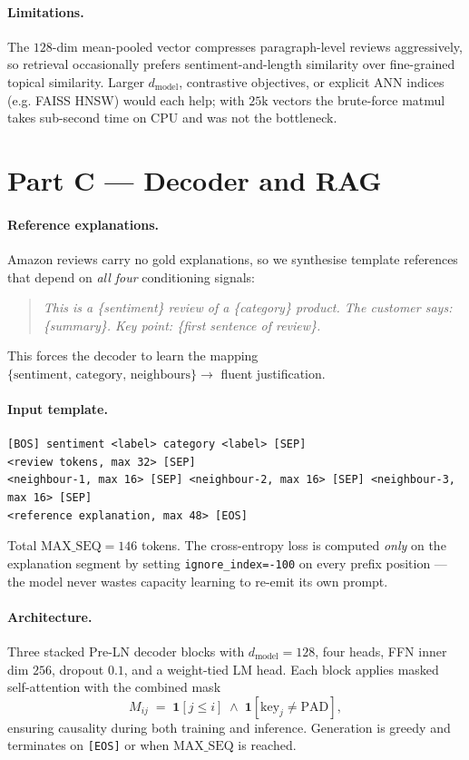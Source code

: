 \documentclass[11pt,a4paper]{article}
\begin{document}
\paragraph{Limitations.}
The $128$-dim mean-pooled vector compresses paragraph-level reviews
aggressively, so retrieval occasionally prefers sentiment-and-length
similarity over fine-grained topical similarity. Larger $d_{\text{model}}$,
contrastive objectives, or explicit ANN indices (e.g. FAISS HNSW) would
each help; with $25\text{k}$ vectors the brute-force matmul takes
sub-second time on CPU and was not the bottleneck.

\section{Part C --- Decoder and RAG}
\label{sec:partc}

\paragraph{Reference explanations.}
Amazon reviews carry no gold explanations, so we synthesise template
references that depend on \emph{all four} conditioning signals:
\begin{quote}\itshape
This is a \{sentiment\} review of a \{category\} product. The customer
says: \{summary\}. Key point: \{first sentence of review\}.
\end{quote}
This forces the decoder to learn the mapping
$\{\text{sentiment, category, neighbours}\} \to$ fluent justification.

\paragraph{Input template.}
\begin{lstlisting}
[BOS] sentiment <label> category <label> [SEP]
<review tokens, max 32> [SEP]
<neighbour-1, max 16> [SEP] <neighbour-2, max 16> [SEP] <neighbour-3, max 16> [SEP]
<reference explanation, max 48> [EOS]
\end{lstlisting}
Total $\text{MAX\_SEQ} = 146$ tokens. The cross-entropy loss is computed
\emph{only} on the explanation segment by setting \texttt{ignore\_index=-100}
on every prefix position --- the model never wastes capacity learning to
re-emit its own prompt.

\paragraph{Architecture.}
Three stacked Pre-LN decoder blocks with $d_{\text{model}} = 128$, four
heads, FFN inner dim $256$, dropout $0.1$, and a weight-tied LM head. Each
block applies masked self-attention with the combined mask
\[
  M_{ij} \;=\; \mathbf{1}[j \le i]\;\wedge\;\mathbf{1}[\text{key}_j \neq \text{PAD}],
\]
ensuring causality during both training and inference. Generation is
greedy and terminates on \texttt{[EOS]} or when $\text{MAX\_SEQ}$ is reached.
\end{document}
